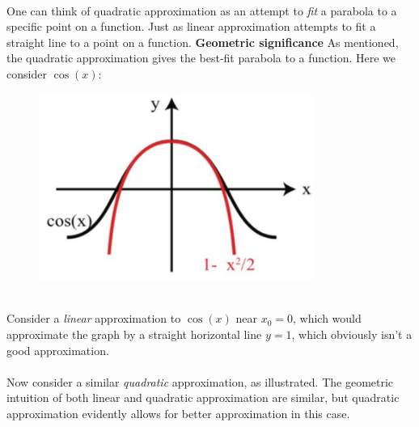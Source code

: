 \documentclass{report}
\begin{document}
\vspace{1mm}\\
One can think of quadratic approximation as an attempt
to \textit{fit} a parabola to a specific point on a function. Just as linear approximation
attempts to fit a straight line to a point on a function.
\newpage
\noindent\textbf{Geometric significance}
As mentioned, the quadratic approximation gives the best-fit parabola to a function. 
Here we consider $\cos(x)$:
\begin{figure}[h]
\includegraphics[width=9cm]{Capture21}\\
\centering
{} 
\end{figure}\\
Consider a \textit{linear} approximation to $\cos(x)$ near $x_0=0$, which would 
approximate the graph by a straight horizontal line $y=1$, which obviously isn't a good approximation.\\
\vspace{1mm}\\
Now consider a similar \textit{quadratic} approximation, as illustrated. The 
geometric intuition of both linear and quadratic approximation are similar,
but quadratic approximation evidently allows for better approximation in this case.
\newpage
\end{document}
